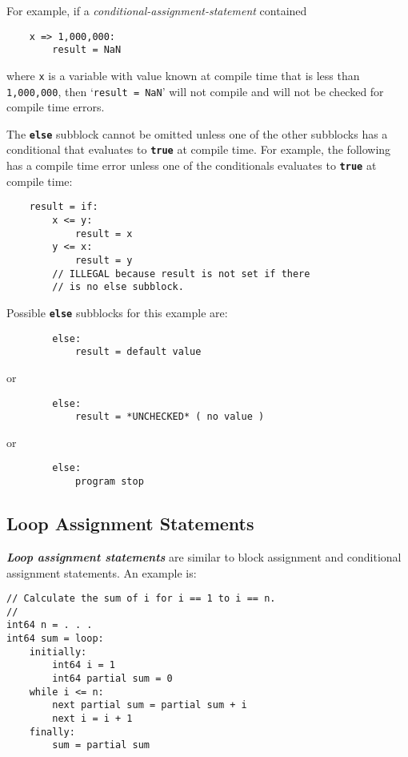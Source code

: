 \documentclass[12pt]{article}
\newcommand{\TT}[1]{{\tt \bfseries #1}}
\newcommand{\ikey}[2]{{\bf \em #1}\index{#2}}
\newenvironment{indpar}[1][0.3in]%
	{\begin{list}{}%
		     {\setlength{\itemsep}{0in}%
		      \setlength{\topsep}{0in}%
		      \setlength{\parsep}{1ex}%
		      \setlength{\labelwidth}{#1}%
		      \setlength{\leftmargin}{#1}%
		      \addtolength{\leftmargin}{\labelsep}}%
	 \item}%
	{\end{list}}
\begin{document}
For example, if a {\em conditional-assignment-statement}
contained
\begin{indpar}\begin{verbatim}
    x => 1,000,000:
        result = NaN
\end{verbatim}\end{indpar}
where {\tt x} is a variable with value known at compile time
that is less than {\tt 1,000,000}, then
`{\tt result = NaN}' will not compile
and will not be checked for compile time errors.

The \TT{else} subblock cannot be omitted unless one of the
other subblocks has a conditional that evaluates to \TT{true}
at compile time.  For
example, the following has a compile time error unless
one of the conditionals evaluates to \TT{true} at compile time:
\begin{indpar}\begin{verbatim}
    result = if:
        x <= y:
            result = x
        y <= x:
            result = y
        // ILLEGAL because result is not set if there
        // is no else subblock.
\end{verbatim}\end{indpar}
Possible \TT{else} subblocks for this example are:
\begin{indpar}\begin{verbatim}
        else:
            result = default value
\end{verbatim}\end{indpar}
or
\begin{indpar}\begin{verbatim}
        else:
            result = *UNCHECKED* ( no value )
\end{verbatim}\end{indpar}
or
\begin{indpar}\begin{verbatim}
        else:
            program stop
\end{verbatim}\end{indpar}

\subsection{Loop Assignment Statements}
\label{LOOP-ASSIGNMENT-STATEMENTS}

\ikey{Loop assignment statements}{loop assignment}
are similar to block assignment
and conditional assignment statements.  An example is:
\begin{indpar}\begin{verbatim}
// Calculate the sum of i for i == 1 to i == n.
//
int64 n = . . .
int64 sum = loop:
    initially:
        int64 i = 1
        int64 partial sum = 0
    while i <= n:
        next partial sum = partial sum + i
        next i = i + 1
    finally:
        sum = partial sum
\end{verbatim}\end{indpar}
\end{document}
